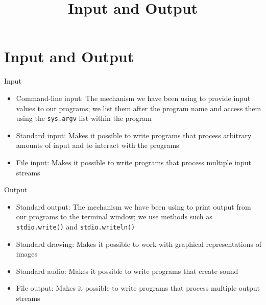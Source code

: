 \documentclass[8pt,a4paper,compress]{beamer}
\title{Input and Output}
\date{}
\begin{document}
\begin{frame}
\vfill
\titlepage
\end{frame}

\section{Input and Output}
\begin{frame}[fragile]
\pause

\begin{center}
\end{center}

\pause\bigskip

Input
\begin{itemize}
\pause
\item Command-line input: The mechanism we have been using to provide
input values to our programs; we list them after the program name and access them using the \lstinline{sys.argv} list within the program

\pause
\item Standard input: Makes it possible to write programs that
process arbitrary amounts of input and to interact with the programs

\pause
\item File input: Makes it possible to write programs that process multiple input streams
\end{itemize}

\pause\bigskip

Output
\begin{itemize}
\pause
\item Standard output: The mechanism we have been using to print output from our programs to the terminal window; we use methods such as \lstinline{stdio.write()} and \lstinline{stdio.writeln()}

\pause
\item Standard drawing: Makes it possible to work with graphical representations of images

\pause
\item Standard audio: Makes it possible to write programs that create sound

\pause
\item File output: Makes it possible to write programs that process multiple output streams
\end{itemize}
\end{frame}
\end{document}

